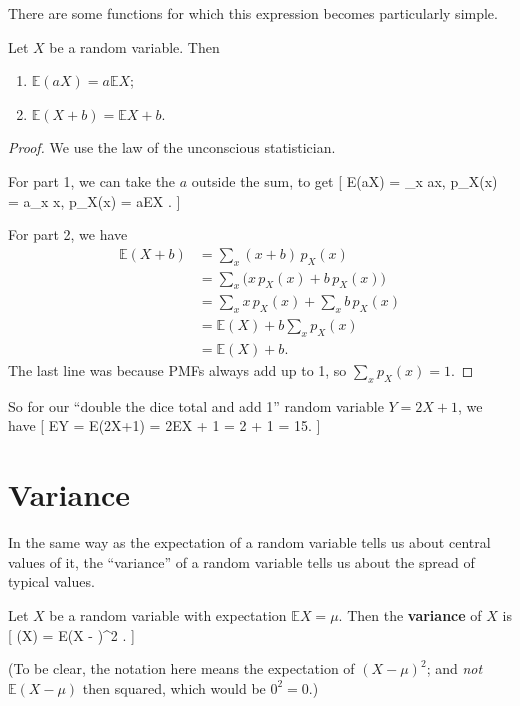 \documentclass[
  letterpaper,
]{report}
\providecommand{\tightlist}{%
  \setlength{\itemsep}{0pt}\setlength{\parskip}{0pt}}\usepackage{longtable,booktabs,array}
\theoremstyle{definition}
\theoremstyle{definition}
\theoremstyle{remark}
\begin{document}
There are some functions for which this expression becomes particularly
simple.

\leavevmode{}%
Let \(X\) be a random variable. Then

\begin{enumerate}
\def\labelenumi{\arabic{enumi}.}
\tightlist
\item
  \(\mathbb E(aX) = a\mathbb EX\);
\item
  \(\mathbb E(X + b) = \mathbb EX + b\).
\end{enumerate}

\begin{proof}

We use the law of the unconscious statistician.

For part 1, we can take the \(a\) outside the sum, to get {[}
\mathbb E(aX) = \sum\_x ax, p\_X(x) = a\sum\_x x, p\_X(x) = a\mathbb EX
. {]}

For part 2, we have \begin{align*}
  \mathbb E(X+b) &= \sum_x (x + b)\, p_X(x) \\
    &= \sum_x \big( x\, p_X(x) + b\,p_X(x) \big) \\
    &= \sum_x x\, p_X(x) + \sum_x b\,p_X(x) \\
    &= \mathbb E(X) + b \sum_x p_X(x) \\
    &= \mathbb E(X) + b .
\end{align*} The last line was because PMFs always add up to 1, so
\(\sum_x p_X(x) = 1\).

\end{proof}

So for our ``double the dice total and add 1'' random variable
\(Y = 2X + 1\), we have {[} \mathbb EY = \mathbb E(2X+1) = 2\mathbb EX +
1 = 2 + 1 = 15. {]}

\hypertarget{variance}{%
\section{Variance}\label{variance}}

In the same way as the expectation of a random variable tells us about
central values of it, the ``variance'' of a random variable tells us
about the spread of typical values.

Let \(X\) be a random variable with expectation \(\mathbb EX = \mu\).
Then the \textbf{variance} of \(X\) is {[} \Var(X) = \mathbb E(X -
\mu)\^{}2 . {]}

(To be clear, the notation here means the expectation of \((X-\mu)^2\);
and \emph{not} \(\mathbb E(X - \mu)\) then squared, which would be
\(0^2 = 0\).)
\end{document}

